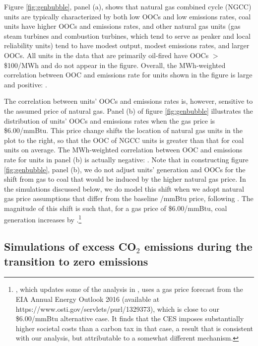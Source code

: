 \documentclass[12pt]{article}
\begin{document}
Figure \ref{fig:genbubble}, panel (a), shows that natural gas combined cycle (NGCC) units are typically characterized by both low OOCs and low emissions rates, coal units have higher OOCs and emissions rates, and other natural gas units (gas steam turbines and combustion turbines, which tend to serve as peaker and local reliability units) tend to have modest output, modest emissions rates, and larger OOCs. All units in the data that are primarily oil-fired have OOCs $>$ \$100/MWh and do not appear in the figure. Overall, the MWh-weighted correlation between OOC and emissions rate for units shown in the figure is large and positive: \unskip.

The correlation between units' OOCs and emissions rates is, however, sensitive to the assumed price of natural gas. Panel (b) of figure \ref{fig:genbubble} illustrates the distribution of units' OOCs and emissions rates when the gas price is \$6.00/mmBtu. This price change shifts the location of natural gas units in the plot to the right, so that the OOC of NGCC units is greater than that for coal units on average. The MWh-weighted correlation between OOC and emissions rate for units in panel (b) is actually negative: \unskip. Note that in constructing figure \ref{fig:genbubble}, panel (b), we do not adjust units' generation and OOCs for the shift from gas to coal that would be induced by the higher natural gas price. In the simulations discussed below, we do model this shift when we adopt natural gas price assumptions that differ from the baseline \unskip/mmBtu price, following \cite{cullmans17}. The magnitude of this shift is such that, for a gas price of \$6.00/mmBtu, coal generation increases by \unskip.\footnote{\cite{goulder2018confronting}, which updates some of the analysis in \cite{goulder2016general}, uses a gas price forecast from the EIA Annual Energy Outlook 2016 (available at https://www.osti.gov/servlets/purl/1329373), which is close to our \$6.00/mmBtu alternative case.  It finds that the CES imposes substantially higher societal costs than a carbon tax in that case, a result that is consistent with our analysis, but attributable to a somewhat different mechanism.}


\subsection{Simulations of excess CO$_2$ emissions during the transition to zero emissions}\label{sec:transition_sim}
\end{document}

